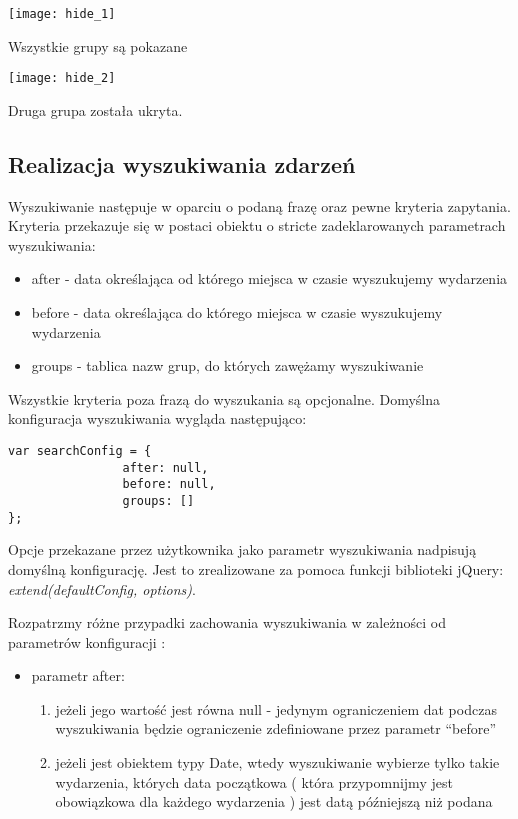 \documentclass[polish,12pt]{aghthesis}
\begin{document}
\texttt{[image: hide\_1]}
\begin{center}
Wszystkie grupy są pokazane
\end{center}

\texttt{[image: hide\_2]}
\begin{center}
Druga grupa została ukryta.
\end{center}


\subsection{Realizacja wyszukiwania zdarzeń}

Wyszukiwanie następuje w oparciu o podaną frazę oraz pewne kryteria zapytania.
Kryteria przekazuje się w postaci obiektu o stricte zadeklarowanych parametrach wyszukiwania:
\begin{itemize}
	\item after - data określająca od którego miejsca w czasie wyszukujemy wydarzenia
	\item before - data określająca do którego miejsca w czasie wyszukujemy wydarzenia
	\item groups - tablica nazw grup, do których zawężamy wyszukiwanie	
\end{itemize}


Wszystkie kryteria poza frazą do wyszukania są opcjonalne. Domyślna konfiguracja wyszukiwania wygląda następująco:\\

\begin{lstlisting}
var searchConfig = {
                after: null,
                before: null,
                groups: []
};
\end{lstlisting}

Opcje przekazane przez użytkownika jako parametr wyszukiwania nadpisują domyślną konfigurację.
Jest to zrealizowane za pomoca funkcji biblioteki jQuery:
\textit{extend(defaultConfig, options)}. 

Rozpatrzmy różne przypadki zachowania wyszukiwania w zależności od parametrów konfiguracji :
\begin{itemize}
	\item parametr after:
	\begin{enumerate}
			\item jeżeli jego wartość jest równa null - jedynym ograniczeniem dat podczas wyszukiwania będzie ograniczenie zdefiniowane przez parametr “before”
		\item jeżeli jest obiektem typy Date, wtedy wyszukiwanie wybierze tylko takie wydarzenia, których data początkowa ( która przypomnijmy jest obowiązkowa dla każdego wydarzenia ) jest datą późniejszą niż podana
	\end{enumerate}
\end{itemize}
\end{document}
